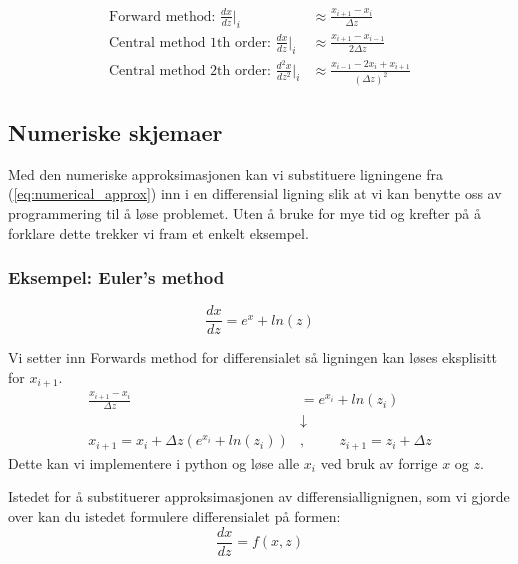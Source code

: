 \begin{equation}
    \begin{split}
    \label{eq:numerical_approx}        
    \text{Forward method: }\frac{dx}{dz}\Big|_i &\approx \frac{x_{i+1}-x_i}{\Delta z} \\
    \text{Central method 1th order: }\frac{dx}{dz}\Big|_i &\approx \frac{x_{i+1}-x_{i-1}}{2\Delta z}\\
    \text{Central method 2th order: }\frac{d^2x}{dz^2}\Big|_i &\approx \frac{x_{i-1}-2x_i+x_{i+1}}{(\Delta z)^2}
    \end{split}
\end{equation}
    

\subsection{Numeriske skjemaer}
Med den numeriske approksimasjonen kan vi substituere ligningene fra (\ref{eq:numerical_approx}) inn i en differensial ligning slik at vi kan benytte oss av programmering til å løse problemet. Uten å bruke for mye tid og krefter på å forklare dette trekker vi fram et enkelt eksempel.

\subsubsection{Eksempel: Euler's method}

\begin{equation}
    \frac{dx}{dz} = e^x + ln(z)  
\end{equation}

Vi setter inn Forwards method for differensialet så ligningen kan løses eksplisitt for $x_{i+1}$.
\begin{align}
    \frac{x_{i+1}-x_i}{\Delta z} &= e^{x_i} + ln(z_i)  \\
    &\downarrow \\
    \label{eq:eulers_methdo_example}
    x_{i+1} = x_i +\Delta z(e^{x_i} + ln(z_i))&, \hspace{1cm} z_{i+1} = z_i + \Delta z
\end{align}
Dette kan vi implementere i python og løse alle $x_i$ ved bruk av forrige $x$ og $z$.

Istedet for å substituerer approksimasjonen av differensiallignignen, som vi gjorde over kan du istedet formulere differensialet på formen:
\begin{equation}
     \frac{dx}{dz} = f(x,z)
\end{equation}

